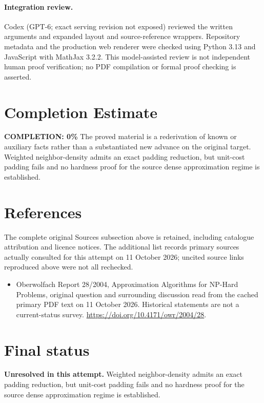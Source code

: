 \documentclass[11pt]{article}
\begin{document}
\paragraph{Integration review.} Codex (GPT-6; exact serving revision not exposed) reviewed the written arguments and expanded layout and source-reference wrappers. Repository metadata and the production web renderer were checked using Python 3.13 and JavaScript with MathJax 3.2.2. This model-assisted review is not independent human proof verification; no PDF compilation or formal proof checking is asserted.

\section{Completion Estimate}
\noindent\textbf{COMPLETION: 0\%}
The proved material is a rederivation of known or auxiliary facts rather than a substantiated new advance on the original target. Weighted neighbor-density admits an exact padding reduction, but unit-cost padding fails and no hardness proof for the source dense approximation regime is established.
\section{References}
The complete original Sources subsection above is retained, including catalogue attribution and licence notices. The additional list records primary sources actually consulted for this attempt on 11 October 2026; uncited source links reproduced above were not all rechecked.
\begin{itemize}
\item Oberwolfach Report 28/2004, Approximation Algorithms for NP-Hard Problems, original question and surrounding discussion read from the cached primary PDF text on 11 October 2026. Historical statements are not a current-status survey. \url{https://doi.org/10.4171/owr/2004/28}.
\end{itemize}
\section{Final status}
\textbf{Unresolved in this attempt.} Weighted neighbor-density admits an exact padding reduction, but unit-cost padding fails and no hardness proof for the source dense approximation regime is established.
\end{document}
